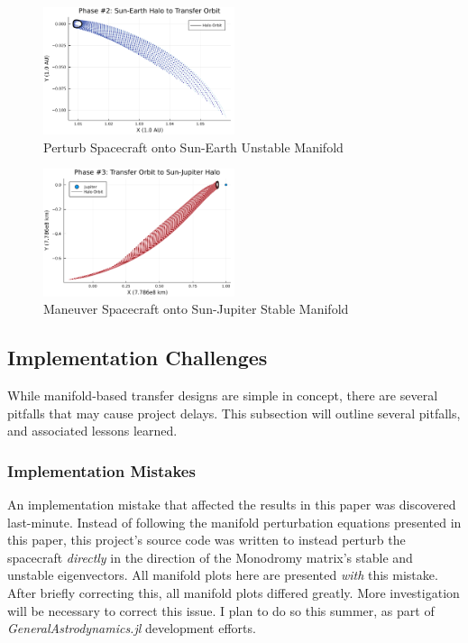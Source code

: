 \documentclass[conf]{new-aiaa}
\begin{document}
\begin{multicols}{2}
\begin{figure}[H]
    \hskip -0.3cm
    \includegraphics[width=0.5\textwidth]{manifold_transfer_phase2.png}
    \caption{Perturb Spacecraft onto Sun-Earth Unstable Manifold}
\end{figure}

\begin{figure}[H]
    \hskip -0.3cm
    \includegraphics[width=0.5\textwidth]{manifold_transfer_phase3.png}
    \caption{Maneuver Spacecraft onto Sun-Jupiter Stable Manifold}
\end{figure}

\subsection{Implementation Challenges}
While manifold-based transfer designs are simple in concept, there 
are several pitfalls that may cause project delays. This subsection 
will outline several pitfalls, and associated lessons learned.

\subsubsection*{Implementation Mistakes}
An implementation mistake that affected the results in this paper
was discovered last-minute. Instead of following the manifold 
perturbation equations presented in this paper, this project's 
source code was written to instead perturb the spacecraft 
\textit{directly} in the direction of the Monodromy matrix's
stable and unstable eigenvectors. All manifold plots here 
are presented \textit{with} this mistake. After briefly correcting this, 
all manifold plots differed greatly. More investigation will be 
necessary to correct this issue. I plan to do so this summer, as 
part of \textit{GeneralAstrodynamics.jl} development efforts.


\end{multicols}
\end{document}
